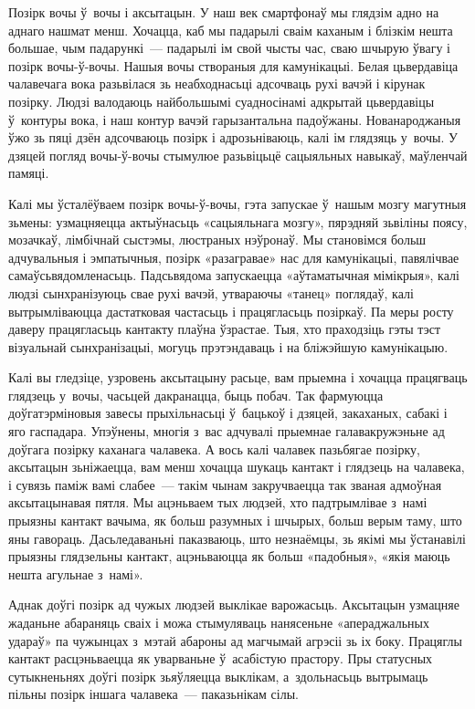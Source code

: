 Позірк вочы ў~вочы і аксытацын. У наш век смартфонаў мы глядзім адно на аднаго нашмат менш. Хочацца, каб мы падарылі сваім каханым і блізкім нешта большае, чым падарункі~--- падарылі ім свой чысты час, сваю шчырую ўвагу і позірк вочы-ў-вочы. Нашыя вочы створаныя для камунікацыі. Белая цьвердавіца чалавечага вока разьвілася зь неабходнасьці адсочваць рухі вачэй і кірунак позірку. Людзі валодаюць найбольшымі суадносінамі адкрытай цьвердавіцы ў~контуры вока, і наш контур вачэй гарызантальна падоўжаны. Нованароджаныя ўжо зь пяці дзён адсочваюць позірк і адрозьніваюць, калі ім глядзяць у~вочы. У дзяцей погляд вочы-ў-вочы стымулюе разьвіцьцё сацыяльных навыкаў, маўленчай памяці. 

Калі мы ўсталёўваем позірк вочы-ў-вочы, гэта запускае ў~нашым мозгу магутныя зьмены: узмацняецца актыўнасьць «сацыяльнага мозгу», пярэдняй зьвіліны поясу, мозачкаў, лімбічнай сыстэмы, люстраных нэўронаў. Мы становімся больш адчувальныя і эмпатычныя, позірк «разагравае» нас для камунікацыі, павялічвае самаўсьвядомленасьць. Падсьвядома запускаецца «аўтаматычная мімікрыя», калі людзі сынхранізуюць свае рухі вачэй, утвараючы «танец» поглядаў, калі вытрымліваюцца дастатковая частасьць і працягласьць позіркаў. Па меры росту даверу працягласьць кантакту плаўна ўзрастае. Тыя, хто праходзіць гэты тэст візуальнай сынхранізацыі, могуць прэтэндаваць і на бліжэйшую камунікацыю.

Калі вы гледзіце, узровень аксытацыну расьце, вам прыемна і хочацца працягваць глядзець у~вочы, часьцей дакранацца, быць побач. Так фармуюцца доўгатэрміновыя завесы прыхільнасьці ў~бацькоў і дзяцей, закаханых, сабакі і яго гаспадара. Упэўнены, многія з~вас адчувалі прыемнае галавакружэньне ад доўгага позірку каханага чалавека. А вось калі чалавек пазьбягае позірку, аксытацын зьніжаецца, вам менш хочацца шукаць кантакт і глядзець на чалавека, і сувязь паміж вамі слабее~--- такім чынам закручваецца так званая адмоўная аксытацынавая пятля. Мы ацэньваем тых людзей, хто падтрымлівае з~намі прыязны кантакт вачыма, як больш разумных і шчырых, больш верым таму, што яны гавораць. Дасьледаваньні паказваюць, што незнаёмцы, зь якімі мы ўстанавілі прыязны глядзельны кантакт, ацэньваюцца як больш «падобныя», «якія маюць нешта агульнае з~намі».

Аднак доўгі позірк ад чужых людзей выклікае варожасьць. Аксытацын узмацняе жаданьне абараняць сваіх і можа стымуляваць нанясеньне «апераджальных удараў» па чужынцах з~мэтай абароны ад магчымай агрэсіі зь іх боку. Працяглы кантакт расцэньваецца як уварваньне ў~асабістую прастору. Пры статусных сутыкненьнях доўгі позірк зьяўляецца выклікам, а~здольнасьць вытрымаць пільны позірк іншага чалавека~--- паказьнікам сілы. 

